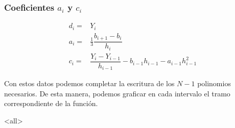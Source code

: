 \begin{frame}[label=FrameEquationRecurrencias]
  \frametitle<presentation>{Coeficientes $a_i$ y $c_i$}
  \begin{equation}
    \begin{aligned}
      d_i =& Y_i \\
      a_i =& \frac{1}{3} \dfrac{ b_{i+1} - b_i }{h_i} \\
      c_i =& \dfrac{ Y_i - Y_{i-1} }{ h_{i-1} } - b_{i-1} h_{i-1}  - a_{i-1} h_{i-1} ^2
    \end{aligned}
  \end{equation}


\end{frame}
Con estos datos podemos completar la escritura de los $N-1$ polinomios
necesarios. De esta manera, podemos graficar en cada intervalo 
el tramo correspondiente de la función.

\mode*
\mode<all>

